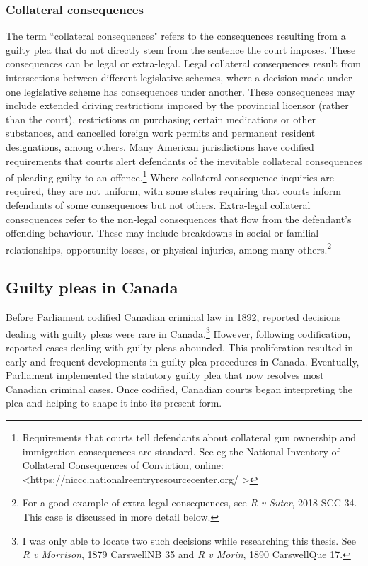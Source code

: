 \subsubsection{Collateral consequences}

The term ``collateral consequences" refers to the consequences resulting from a guilty plea that do not directly stem from the sentence the court imposes. These consequences can be legal or extra-legal. Legal collateral consequences result from intersections between different legislative schemes, where a decision made under one legislative scheme has consequences under another. These consequences may include extended driving restrictions imposed by the provincial licensor (rather than the court), restrictions on purchasing certain medications or other substances, and cancelled foreign work permits and permanent resident designations, among others. Many American jurisdictions have codified requirements that courts alert defendants of the inevitable collateral consequences of pleading guilty to an offence.\footnote{Requirements that courts tell defendants about collateral gun ownership and immigration consequences are standard. See eg the National Inventory of Collateral Consequences of Conviction, online: \textless https://niccc.nationalreentryresourcecenter.org/ \textgreater} Where collateral consequence inquiries are required, they are not uniform, with some states requiring that courts inform defendants of some consequences but not others. Extra-legal collateral consequences refer to the non-legal consequences that flow from the defendant's offending behaviour. These may include breakdowns in social or familial relationships, opportunity losses, or physical injuries, among many others.\footnote{For a good example of extra-legal consequences, see \textit{R v Suter}, 2018 SCC 34. This case is discussed in more detail below.}

\subsection{Guilty pleas in Canada}

Before Parliament codified Canadian criminal law in 1892, reported decisions dealing with guilty pleas were rare in Canada.\footnote{I was only able to locate two such decisions while researching this thesis. See \textit{R v Morrison}, 1879 CarswellNB 35 and \textit{R v Morin}, 1890 CarswellQue 17.} However, following codification, reported cases dealing with guilty pleas abounded. This proliferation resulted in early and frequent developments in guilty plea procedures in Canada. Eventually, Parliament implemented the statutory guilty plea that now resolves most Canadian criminal cases. Once codified, Canadian courts began interpreting the plea and helping to shape it into its present form.

